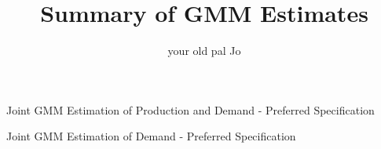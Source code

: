 \documentclass{article}
\title{Summary of GMM Estimates}
\author{your old pal Jo}
\begin{document}
\maketitle

\begin{table}\footnotesize{Joint GMM Estimation of Production and Demand - Preferred Specification}
    \begin{center}
        
    \end{center}
\end{table}

\begin{table}\footnotesize{Joint GMM Estimation of Demand - Preferred Specification}
    \begin{center}
        
    \end{center}
\end{table}
\end{document}

